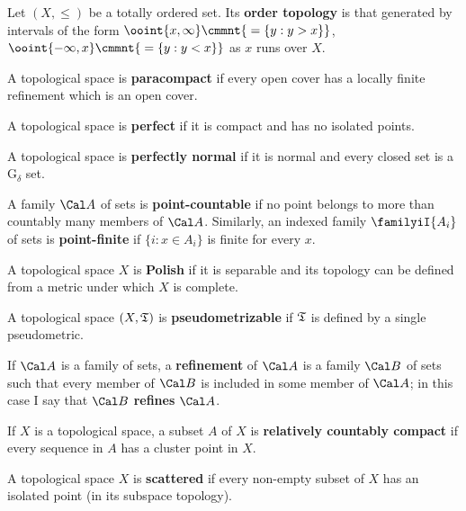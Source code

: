   Let $(X,\le)$ be a totally ordered set.   Its
{\bf order topology} is that generated by intervals of the form
$\ooint{x,\infty}\cmmnt{\mskip5mu =\{y:y>x\}}$,
$\ooint{-\infty,x}\cmmnt{\mskip5mu =\{y:y<x\}}$ as $x$ runs over $X$.

 A topological space is {\bf paracompact} if every
open cover has a locally finite refinement which is an
open cover.   

 A topological space is {\bf perfect} if
it is compact and has no isolated points.

 A topological space is {\bf perfectly normal}
if it is normal and every closed set is a G$_{\delta}$ set.

 A family $\Cal A$ of sets is
{\bf point-countable} if no
point belongs to more than countably many members of $\Cal A$.
Similarly, an indexed family $\familyiI{A_i}$ of sets is
{\bf point-finite} if $\{i:x\in A_i\}$ is finite for every $x$.

 A topological space $X$ is {\bf Polish} if it is
separable
and its topology can be defined from a metric under which $X$ is
complete.

 A topological space $(X,\frak T)$ is
{\bf pseudometrizable} if $\frak T$ is defined by a single
pseudometric.

 If $\Cal A$ is a family of sets, a {\bf
refinement}
of $\Cal A$ is a family $\Cal B$ of sets such that every member of
$\Cal B$ is included in some member of $\Cal A$;  in this case I say
that $\Cal B$ {\bf refines} $\Cal A$.   

 If $X$ is a topological space, a
subset $A$ of $X$ is {\bf relatively countably compact} if every
sequence in $A$ has a cluster point in $X$.   

 A topological space $X$ is {\bf scattered} if every
non-empty subset of $X$ has an isolated point (in its subspace
topology).

